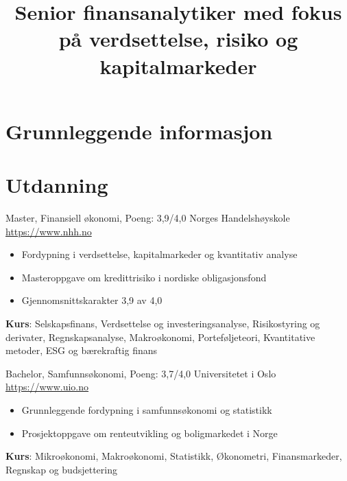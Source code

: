 \documentclass[a4paper, serif, 10pt]{moderncv}
\title{Senior finansanalytiker med fokus på verdsettelse, risiko og kapitalmarkeder}
\begin{document}
\maketitle

\section{Grunnleggende informasjon}

\section{Utdanning}

        {Master, Finansiell økonomi, Poeng: 3,9/4,0}
        {Norges Handelshøyskole}
        {\url{https://www.nhh.no}}
        {}
        {\begin{itemize}
\item Fordypning i verdsettelse, kapitalmarkeder og kvantitativ analyse
\item Masteroppgave om kredittrisiko i nordiske obligasjonsfond
\item Gjennomsnittskarakter 3,9 av 4,0
\end{itemize}
\textbf{Kurs}: Selskapsfinans, Verdsettelse og investeringsanalyse, Risikostyring og derivater, Regnskapsanalyse, Makroøkonomi, Porteføljeteori, Kvantitative metoder, ESG og bærekraftig finans}

        {Bachelor, Samfunnsøkonomi, Poeng: 3,7/4,0}
        {Universitetet i Oslo}
        {\url{https://www.uio.no}}
        {}
        {\begin{itemize}
\item Grunnleggende fordypning i samfunnsøkonomi og statistikk
\item Prosjektoppgave om renteutvikling og boligmarkedet i Norge
\end{itemize}
\textbf{Kurs}: Mikroøkonomi, Makroøkonomi, Statistikk, Økonometri, Finansmarkeder, Regnskap og budsjettering}
\end{document}
